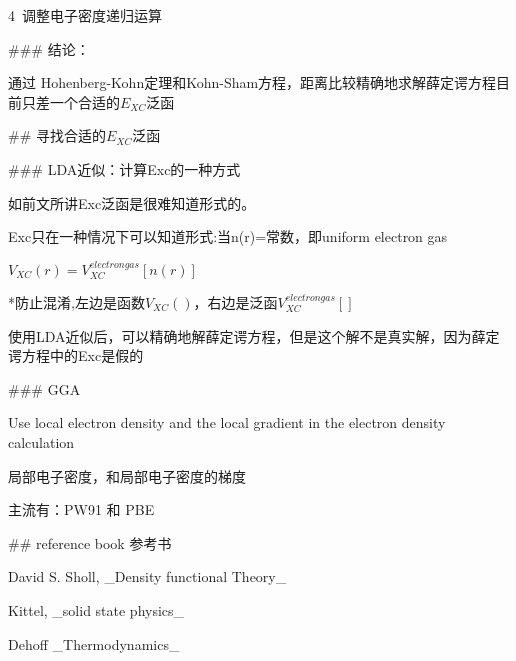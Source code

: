 \documentclass{article}
\begin{document}
4\ 调整电子密度递归运算

### 结论：

通过 Hohenberg-Kohn定理和Kohn-Sham方程，距离比较精确地求解薛定谔方程目前只差一个合适的$E_{XC}$泛函

## 寻找合适的$E_{XC}$泛函

### LDA近似：计算Exc的一种方式

如前文所讲Exc泛函是很难知道形式的。

Exc只在一种情况下可以知道形式:当n(r)=常数，即uniform electron gas

$V_{XC}(r)=V^{electron gas}_{XC}[n(r)]$

*防止混淆,左边是函数$V_{XC}()$，右边是泛函$V^{electron gas}_{XC}[]$

使用LDA近似后，可以精确地解薛定谔方程，但是这个解不是真实解，因为薛定谔方程中的Exc是假的

### GGA

Use local electron density and the local gradient in the electron density calculation

局部电子密度，和局部电子密度的梯度

主流有：PW91 和 PBE

 

## reference book 参考书

David S. Sholl, _Density functional Theory_

Kittel, _solid state physics_

Dehoff _Thermodynamics_
\end{document}
